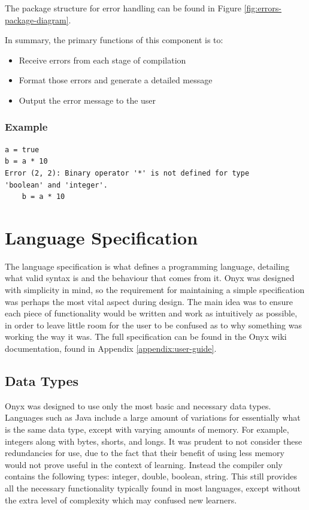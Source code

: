 \documentclass[
]{report}
\begin{document}
The package structure for error handling can be found in Figure \ref{fig:errors-package-diagram}.

In summary, the primary functions of this component is to:
\begin{itemize}
	\item Receive errors from each stage of compilation
	\item Format those errors and generate a detailed message
	\item Output the error message to the user
\end{itemize}

\subsubsection{Example}
\begin{verbatim}
a = true
b = a * 10
Error (2, 2): Binary operator '*' is not defined for type 
'boolean' and 'integer'.
    b = a * 10
\end{verbatim}

\section{Language Specification}
The language specification is what defines a programming language,
detailing what valid syntax is and the behaviour that comes from it.
Onyx was designed with simplicity in mind, so the requirement for
maintaining a simple specification was perhaps the most vital aspect
during design. The main idea was to ensure each piece of functionality
would be written and work as intuitively as possible, in order to leave
little room for the user to be confused as to why something was working
the way it was. The full specification can be found in the Onyx wiki
documentation, found in Appendix \ref{appendix:user-guide}.

\subsection{Data Types}
Onyx was designed to use only the most basic and necessary data types.
Languages such as Java include a large amount of variations for
essentially what is the same data type, except with varying amounts of
memory. For example, integers along with bytes, shorts, and longs. It
was prudent to not consider these redundancies for use, due to the fact
that their benefit of using less memory would not prove useful in the
context of learning. Instead the compiler only contains the following
types: integer, double, boolean, string. This still provides all the
necessary functionality typically found in most languages, except
without the extra level of complexity which may confused new learners.
\end{document}
